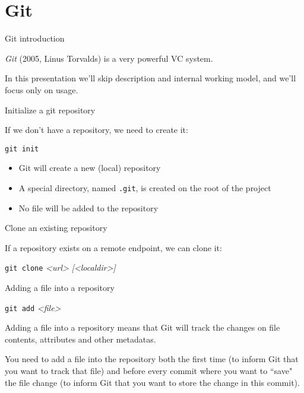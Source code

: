
\section{Git}

\begin{frame}{Git introduction}

\textit{Git} (2005, Linus Torvalds) is a very powerful VC system.

\vspace{2em}

In this presentation we'll skip description and internal working model, and we'll
focus only on usage.

\end{frame}


\begin{frame}[fragile]{Initialize a git repository}

If we don't have a repository, we need to create it:

\vspace{2em}

\Large \texttt{git init}

\vspace{2em}

\normalsize
\begin{itemize}
  \item Git will create a new (local) repository
  \item A special directory, named \texttt{.git}, is created on the root of the
  project
  \item No file will be added to the repository
\end{itemize}

\end{frame}


\begin{frame}[fragile]{Clone an existing repository}

If a repository exists on a remote endpoint, we can clone it:

\vspace{2em}

\Large \texttt{git clone} \textit{<url>} \textit{[<localdir>]}

\vspace{2em}

\end{frame}


\begin{frame}[fragile]{Adding a file into a repository}

\vspace{2em}

\Large \texttt{git add} \textit{<file>}

\vspace{2em}

\normalsize
Adding a file into a repository means that Git will track the changes on file
contents, attributes and other metadatas.

You need to add a file into the repository both the first time (to inform Git that
you want to track that file) and before every commit where you want to ``save"
the file change (to inform Git that you want to store the change in this commit).

\end{frame}


